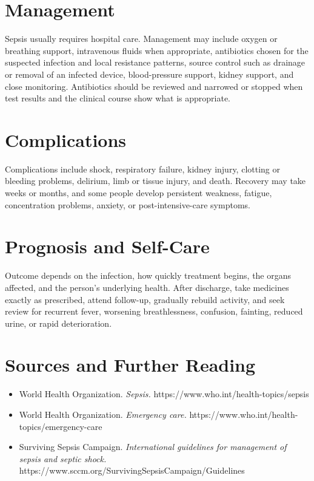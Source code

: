 \section*{Management}
Sepsis usually requires hospital care. Management may include oxygen or breathing support, intravenous fluids when appropriate, antibiotics chosen for the suspected infection and local resistance patterns, source control such as drainage or removal of an infected device, blood-pressure support, kidney support, and close monitoring. Antibiotics should be reviewed and narrowed or stopped when test results and the clinical course show what is appropriate.

\section*{Complications}
Complications include shock, respiratory failure, kidney injury, clotting or bleeding problems, delirium, limb or tissue injury, and death. Recovery may take weeks or months, and some people develop persistent weakness, fatigue, concentration problems, anxiety, or post-intensive-care symptoms.

\section*{Prognosis and Self-Care}
Outcome depends on the infection, how quickly treatment begins, the organs affected, and the person's underlying health. After discharge, take medicines exactly as prescribed, attend follow-up, gradually rebuild activity, and seek review for recurrent fever, worsening breathlessness, confusion, fainting, reduced urine, or rapid deterioration.

\section*{Sources and Further Reading}
\begin{itemize}
    \item World Health Organization. \textit{Sepsis.} https://www.who.int/health-topics/sepsis
    \item World Health Organization. \textit{Emergency care.} https://www.who.int/health-topics/emergency-care
    \item Surviving Sepsis Campaign. \textit{International guidelines for management of sepsis and septic shock.} https://www.sccm.org/SurvivingSepsisCampaign/Guidelines
\end{itemize}
